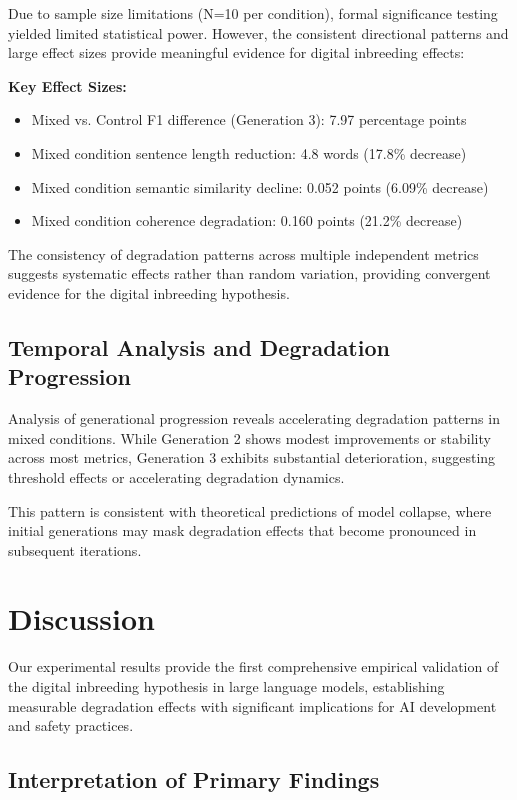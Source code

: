 \documentclass[11pt]{article}
\begin{document}
Due to sample size limitations (N=10 per condition), formal significance testing yielded limited statistical power. However, the consistent directional patterns and large effect sizes provide meaningful evidence for digital inbreeding effects:

\textbf{Key Effect Sizes:}
\begin{itemize}
    \item Mixed vs. Control F1 difference (Generation 3): 7.97 percentage points
    \item Mixed condition sentence length reduction: 4.8 words (17.8\% decrease)  
    \item Mixed condition semantic similarity decline: 0.052 points (6.09\% decrease)
    \item Mixed condition coherence degradation: 0.160 points (21.2\% decrease)
\end{itemize}

The consistency of degradation patterns across multiple independent metrics suggests systematic effects rather than random variation, providing convergent evidence for the digital inbreeding hypothesis.

\subsection{Temporal Analysis and Degradation Progression}

Analysis of generational progression reveals accelerating degradation patterns in mixed conditions. While Generation 2 shows modest improvements or stability across most metrics, Generation 3 exhibits substantial deterioration, suggesting threshold effects or accelerating degradation dynamics.

This pattern is consistent with theoretical predictions of model collapse, where initial generations may mask degradation effects that become pronounced in subsequent iterations.

\section{Discussion}

Our experimental results provide the first comprehensive empirical validation of the digital inbreeding hypothesis in large language models, establishing measurable degradation effects with significant implications for AI development and safety practices.

\subsection{Interpretation of Primary Findings}
\end{document}

